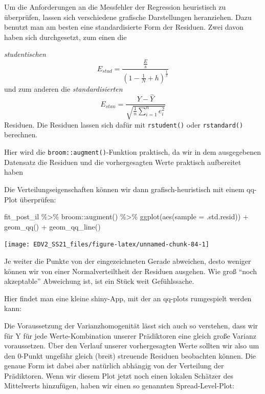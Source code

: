 \documentclass[
]{book}
\newenvironment{Shaded}{\begin{snugshade}}{\end{snugshade}}
\newcommand{\AttributeTok}[1]{\textcolor[rgb]{0.77,0.63,0.00}{#1}}
\newcommand{\FunctionTok}[1]{\textcolor[rgb]{0.00,0.00,0.00}{#1}}
\newcommand{\NormalTok}[1]{#1}
\newcommand{\SpecialCharTok}[1]{\textcolor[rgb]{0.00,0.00,0.00}{#1}}
\begin{document}
Um die Anforderungen an die Messfehler der Regression heuristisch zu überprüfen, lassen sich verschiedene grafische Darstellungen heranziehen.
Dazu benutzt man am besten eine standardisierte Form der Residuen.
Zwei davon haben sich durchgesetzt, zum einen die

\emph{studentischen} \[E_{stud}=\frac{\frac{E}{s}}{(1-\frac{1}{N} + h)^{\frac{1}{2}}}\] und zum anderen die \emph{standardisierten} \[E_{stan}=\frac{Y - \hat{Y}}{\sqrt{\frac{1}{n}\sum_{i=1}^n e_i^2}}\] Residuen.
Die Residuen lassen sich dafür mit \texttt{rstudent()} oder \texttt{rstandard()} berechnen.

Hier wird die \texttt{broom::augment()}-Funktion praktisch, da wir in dem ausgegebenen Datensatz die Residuen und die vorhergesagten Werte praktisch aufbereitet haben

Die Verteilungseigenschaften können wir dann grafisch-heuristisch mit einem qq-Plot überprüfen:

\begin{Shaded}
\begin{Highlighting}[]
\NormalTok{fit\_post\_il }\SpecialCharTok{\%\textgreater{}\%} 
\NormalTok{  broom}\SpecialCharTok{::}\FunctionTok{augment}\NormalTok{() }\SpecialCharTok{\%\textgreater{}\%} 
  \FunctionTok{ggplot}\NormalTok{(}\FunctionTok{aes}\NormalTok{(}\AttributeTok{sample =}\NormalTok{ .std.resid)) }\SpecialCharTok{+}
  \FunctionTok{geom\_qq}\NormalTok{() }\SpecialCharTok{+}
  \FunctionTok{geom\_qq\_line}\NormalTok{()}
\end{Highlighting}
\end{Shaded}

\begin{center}\texttt{[image: EDV2\_SS21\_files/figure-latex/unnamed-chunk-84-1]} \end{center}

Je weiter die Punkte von der eingezeichneten Gerade abweichen, desto weniger können wir von einer Normalverteiltheit der Residuen ausgehen. Wie groß ``noch akzeptable'' Abweichung ist, ist ein Stück weit Gefühlssache.

Hier findet man eine kleine shiny-App, mit der an qq-plots rumgespielt werden kann:

Die Voraussetzung der Varianzhomogenität lässt sich auch so verstehen, dass wir für Y für jede Werte-Kombination unserer Prädiktoren eine gleich große Varianz voraussetzen. Über den Verlauf unserer vorhergesagten Werte sollten wir also um den 0-Punkt ungefähr gleich (breit) streuende Residuen beobachten können. Die genaue Form ist dabei aber natürlich abhängig von der Verteilung der Prädiktoren.
Wenn wir diesem Plot jetzt noch einen lokalen Schätzer des Mittelwerts hinzufügen, haben wir einen so genannten Spread-Level-Plot:
\end{document}
